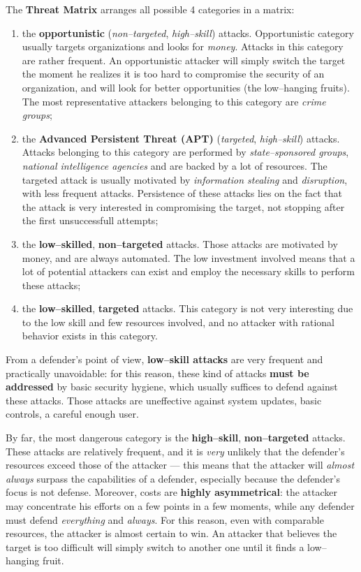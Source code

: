 \documentclass[10pt]{extreport}
\begin{document}
The \textbf{Threat Matrix} arranges all possible 4 categories in a matrix:
\begin{enumerate}
    \item the \textbf{opportunistic} (\emph{non--targeted}, \emph{high--skill})
        attacks. Opportunistic category usually targets organizations and looks
        for \emph{money}. Attacks in this category are rather frequent. An
        opportunistic attacker will simply switch the target the moment he
        realizes it is too hard to compromise the security of an organization,
        and will look for better opportunities (the low--hanging fruits). The
        most representative attackers belonging to this category are
        \emph{crime groups};
    \item the \textbf{Advanced Persistent Threat (APT)} (\emph{targeted},
        \emph{high--skill}) attacks. Attacks belonging to this category are
        performed by \emph{state--sponsored groups}, \emph{national
        intelligence agencies} and are backed by a lot of resources. The
        targeted attack is usually motivated by \emph{information stealing} and
        \emph{disruption}, with less frequent attacks. Persistence of these
        attacks lies on the fact that the attack is very interested in
        compromising the target, not stopping after the first unsuccessfull
        attempts;
    \item the \textbf{low--skilled}, \textbf{non--targeted} attacks. Those
        attacks are motivated by money, and are always automated. The low
        investment involved means that a lot of potential attackers can exist
        and employ the necessary skills to perform these attacks;
    \item the \textbf{low--skilled}, \textbf{targeted} attacks. This category
        is not very interesting due to the low skill and few resources
        involved, and no attacker with rational behavior exists in this
        category.
\end{enumerate}

From a defender's point of view, \textbf{low--skill attacks} are very frequent
and practically unavoidable: for this reason, these kind of attacks
\textbf{must be addressed} by basic security hygiene, which usually suffices to
defend against these attacks. Those attacks are uneffective against system
updates, basic controls, a careful enough user.

By far, the most dangerous category is the \textbf{high--skill},
\textbf{non--targeted} attacks. These attacks are relatively frequent, and it
is \emph{very} unlikely that the defender's resources exceed those of the
attacker --- this means that the attacker will \emph{almost always} surpass the
capabilities of a defender, especially because the defender's focus is not
defense. Moreover, costs are \textbf{highly asymmetrical}: the attacker
may concentrate his efforts on a few points in a few moments, while any
defender must defend \emph{everything} and \emph{always}. For this reason, even
with comparable resources, the attacker is almost certain to win. An attacker
that believes the target is too difficult will simply switch to another one
until it finds a low--hanging fruit.
\end{document}
